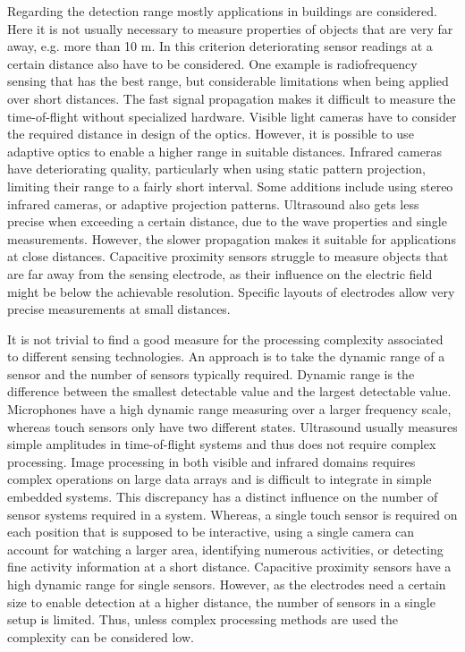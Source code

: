 Regarding the detection range mostly applications in buildings are considered. Here it is not usually necessary to measure properties of objects that are very far away, e.g. more than 10 m. In this criterion deteriorating sensor readings at a certain distance also have to be considered. One example is radiofrequency sensing that has the best range, but considerable limitations when being applied over short distances. The fast signal propagation makes it difficult to measure the time-of-flight without specialized hardware. Visible light cameras have to consider the required distance in design of the optics. However, it is possible to use adaptive optics to enable a higher range in suitable distances. Infrared cameras have deteriorating quality, particularly when using static pattern projection, limiting their range to a fairly short interval. Some additions include using stereo infrared cameras, or adaptive projection patterns. Ultrasound also gets less precise when exceeding a certain distance, due to the wave properties and single measurements. However, the slower propagation makes it suitable for applications at close distances. Capacitive proximity sensors struggle to measure objects that are far away from the sensing electrode, as their influence on the electric field might be below the achievable resolution. Specific layouts of electrodes allow very precise measurements at small distances.

It is not trivial to find a good measure for the processing complexity associated to different sensing technologies. An approach is to take the dynamic range of a sensor and the number of sensors typically required. Dynamic range is the difference between the smallest detectable value and the largest detectable value. Microphones have a high dynamic range measuring over a larger frequency scale, whereas touch sensors only have two different states. Ultrasound usually measures simple amplitudes in time-of-flight systems and thus does not require complex processing. Image processing in both visible and infrared domains requires complex operations on large data arrays and is difficult to integrate in simple embedded systems. This discrepancy has a distinct influence on the number of sensor systems required in a system. Whereas, a single touch sensor is required on each position that is supposed to be interactive, using a single camera can account for watching a larger area, identifying numerous activities, or detecting fine activity information at a short distance. Capacitive proximity sensors have a high dynamic range for single sensors. However, as the electrodes need a certain size to enable detection at a higher distance, the number of sensors in a single setup is limited. Thus, unless complex processing methods are used the complexity can be considered low.

